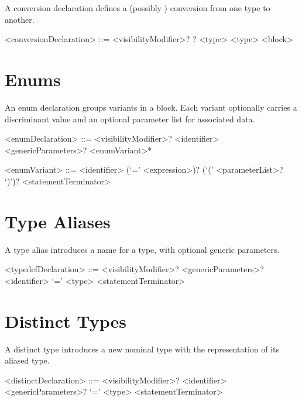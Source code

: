 \documentclass[makeidx]{article}
\begin{document}
\LMHash{}%
A conversion declaration defines a (possibly )
conversion from one type to another.

\begin{grammar}
<conversionDeclaration> ::= <visibilityModifier>? \EXPLICIT{}? \CONVERT{}
  \gnewline{} <type> \TO{} <type> <block>
\end{grammar}

\section{Enums}

\LMHash{}%
An enum declaration groups variants in a  block.
Each variant optionally carries a discriminant value and an optional
parameter list for associated data.

\begin{grammar}
<enumDeclaration> ::= <visibilityModifier>? \ENUM{} <identifier>
  \gnewline{} <genericParameters>? \HAS{} <enumVariant>* \END{}

<enumVariant> ::= <identifier> (`=' <expression>)?
  \gnewline{} (`(' <parameterList>? `)')? <statementTerminator>
\end{grammar}

\section{Type Aliases}

\LMHash{}%
A type alias introduces a name for a type, with optional generic
parameters.

\begin{grammar}
<typedefDeclaration> ::= <visibilityModifier>? \TYPEDEF{}
  \gnewline{} <genericParameters>? <identifier> `=' <type> <statementTerminator>
\end{grammar}

\section{Distinct Types}

\LMHash{}%
A distinct type introduces a new nominal type with the representation
of its aliased type.

\begin{grammar}
<distinctDeclaration> ::= <visibilityModifier>? \DISTINCT{} <identifier>
  \gnewline{} <genericParameters>? `=' <type> <statementTerminator>
\end{grammar}
\end{document}
